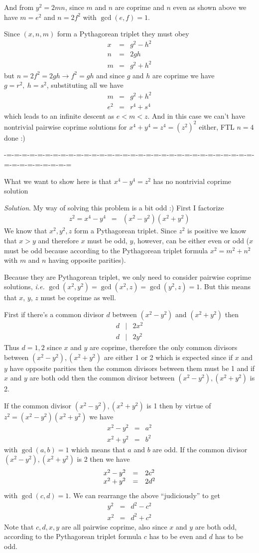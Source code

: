 \documentclass[aps,preprint,preprintnumbers,nofootinbib,showpacs,prd]{revtex4-1}
\newcommand{\ie}{{\it i.e.} }
\newcommand{\nbea}{\begin{eqnarray*}}
\newcommand{\neea}{\end{eqnarray*}}
\begin{document}
And from $y^2 = 2mn$, since $m$ and $n$ are coprime and $n$ even as shown above we have $m = e^2$ and $n = 2f^2$ with $\gcd(e,f)=1$.

Since $(x,n,m)$ form a Pythagorean triplet they must obey
%
\nbea
x & = & g^2 - h^2 \\
n & = & 2gh \\
m & = & g^2 + h^2
\neea
%
but $n = 2f^2 = 2gh \to f^2 = gh$ and since $g$ and $h$ are coprime we have $g = r^2, ~h=s^2$, substituting all we have
%
\nbea
m & = & g^2 + h^2 \\
e^2 & = & r^4 + s^4
\neea
%
which leads to an infinite descent as $e < m < z$. And in this case we can't have nontrivial pairwise coprime solutions for $x^4 + y^4 = z^4 = (z^2)^2$ either, FTL $n=4$ done :)

-=-=-=-=-=-=-=-=-=-=-=-=-=-=-=-=-=-=-=-=-=-=-=-=-=-=-=-=-=-=-=-=-=-=-=-=-=-=-=-=-=


What we want to show here is that $x^4 - y^4 = z^2$ has no nontrivial coprime solution

{\it Solution}. My way of solving this problem is a bit odd :) First I factorize
%
\nbea
z^2 = x^4 - y^4 & = & (x^2 - y^2)(x^2 + y^2)
\neea
%
We know that $x^2,y^2,z$ form a Pythagorean triplet. Since $z^2$ is positive we know that $x > y$ and therefore $x$ must be odd, $y$, however, can be either even or odd ($x$ must be odd because according to the Pythagorean triplet formula $x^2 = m^2 + n^2$ with $m$ and $n$ having opposite parities).

Because they are Pythagorean triplet, we only need to consider pairwise coprime solutions, \ie $\gcd(x^2,y^2)=\gcd(x^2,z)=\gcd(y^2,z)=1$. But this means that $x$, $y$, $z$ must be coprime as well.

First if there's a common divisor $d$ between $(x^2 - y^2)$ and $(x^2 + y^2)$ then
%
\nbea
d &|& 2x^2 \\
d &|& 2y^2
\neea
%
Thus $d=1,2$ since $x$ and $y$ are coprime, therefore the only common divisors between $(x^2 - y^2),(x^2 + y^2)$ are either 1 or 2 which is expected since if $x$ and $y$ have opposite parities then the common divisors between them must be 1 and if $x$ and $y$ are both odd then the common divisor between $(x^2 - y^2),(x^2 + y^2)$ is 2.

If the common divisor $(x^2 - y^2),(x^2 + y^2)$ is 1 then by virtue of $z^2 = (x^2 - y^2)(x^2 + y^2)$ we have
%
\nbea
x^2 - y^2 & = & a^2 \\
x^2 + y^2 & = & b^2
\neea
%
with $\gcd(a,b) = 1$ which means that $a$ and $b$ are odd. If the common divisor $(x^2 - y^2),(x^2 + y^2)$ is 2 then we have
%
\nbea
\begin{array} {r c l}
x^2 - y^2 & = & 2c^2 \\
x^2 + y^2 & = & 2d^2
\end{array}
\neea
%
with $\gcd(c,d) = 1$. We can rearrange the above ``judiciously'' to get
%
\nbea
y^2 & = & d^2 - c^2 \\
x^2 & = & d^2 + c^2
\neea
%
Note that $c,d,x,y$ are all pairwise coprime, also since $x$ and $y$ are both odd, according to the Pythagorean triplet formula $c$ has to be even and $d$ has to be odd.
\end{document}
